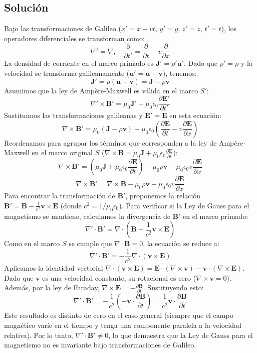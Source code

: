 \documentclass[a4paper,11pt]{article}
\begin{document}
\subsection{Solución}
Bajo las transformaciones de Galileo ($x' = x - vt$, $y' = y$, $z' = z$, $t' = t$), los operadores diferenciales se transforman como:
$$ \nabla' = \nabla, \quad \frac{\partial}{\partial t'} = \frac{\partial}{\partial t} - v \frac{\partial}{\partial x} $$
La densidad de corriente en el marco primado es $\mathbf{J}' = \rho' \mathbf{u}'$. Dado que $\rho' = \rho$ y la velocidad se transforma galileanamente ($\mathbf{u}' = \mathbf{u} - \mathbf{v}$), tenemos:
$$ \mathbf{J}' = \rho (\mathbf{u} - \mathbf{v}) = \mathbf{J} - \rho \mathbf{v} $$
Asumimos que la ley de Ampère-Maxwell es válida en el marco $S'$:
$$ \nabla' \times \mathbf{B}' = \mu_0 \mathbf{J}' + \mu_0 \epsilon_0 \frac{\partial \mathbf{E}'}{\partial t'} $$
Sustituimos las transformaciones galileanas y $\mathbf{E}' = \mathbf{E}$ en esta ecuación:
$$ \nabla \times \mathbf{B}' = \mu_0 (\mathbf{J} - \rho \mathbf{v}) + \mu_0 \epsilon_0 \left( \frac{\partial \mathbf{E}}{\partial t} - v \frac{\partial \mathbf{E}}{\partial x} \right) $$
Reordenamos para agrupar los términos que corresponden a la ley de Ampère-Maxwell en el marco original $S$ ($\nabla \times \mathbf{B} = \mu_0 \mathbf{J} + \mu_0 \epsilon_0 \frac{\partial \mathbf{E}}{\partial t}$):
$$ \nabla \times \mathbf{B}' = \left( \mu_0 \mathbf{J} + \mu_0 \epsilon_0 \frac{\partial \mathbf{E}}{\partial t} \right) - \mu_0 \rho \mathbf{v} - \mu_0 \epsilon_0 v \frac{\partial \mathbf{E}}{\partial x} $$
$$ \nabla \times \mathbf{B}' = \nabla \times \mathbf{B} - \mu_0 \rho \mathbf{v} - \mu_0 \epsilon_0 v \frac{\partial \mathbf{E}}{\partial x} $$
Para encontrar la transformación de $\mathbf{B}'$, proponemos la relación $\mathbf{B}' = \mathbf{B} - \frac{1}{c^2} \mathbf{v} \times \mathbf{E}$ (donde $c^2 = 1/\mu_0\epsilon_0$). Para verificar si la Ley de Gauss para el magnetismo se mantiene, calculamos la divergencia de $\mathbf{B}'$ en el marco primado:
$$ \nabla' \cdot \mathbf{B}' = \nabla \cdot \left( \mathbf{B} - \frac{1}{c^2} \mathbf{v} \times \mathbf{E} \right) $$
Como en el marco $S$ se cumple que $\nabla \cdot \mathbf{B} = 0$, la ecuación se reduce a:
$$ \nabla' \cdot \mathbf{B}' = - \frac{1}{c^2} \nabla \cdot (\mathbf{v} \times \mathbf{E}) $$
Aplicamos la identidad vectorial $\nabla \cdot (\mathbf{v} \times \mathbf{E}) = \mathbf{E} \cdot (\nabla \times \mathbf{v}) - \mathbf{v} \cdot (\nabla \times \mathbf{E})$. Dado que $\mathbf{v}$ es una velocidad constante, su rotacional es cero ($\nabla \times \mathbf{v} = 0$). Además, por la ley de Faraday, $\nabla \times \mathbf{E} = -\frac{\partial \mathbf{B}}{\partial t}$. Sustituyendo esto:
$$ \nabla' \cdot \mathbf{B}' = - \frac{1}{c^2} \left( - \mathbf{v} \cdot \frac{\partial \mathbf{B}}{\partial t} \right) = \frac{1}{c^2} \mathbf{v} \cdot \frac{\partial \mathbf{B}}{\partial t} $$
Este resultado es distinto de cero en el caso general (siempre que el campo magnético varíe en el tiempo y tenga una componente paralela a la velocidad relativa). Por lo tanto, $\nabla' \cdot \mathbf{B}' \neq 0$, lo que demuestra que la Ley de Gauss para el magnetismo no es invariante bajo transformaciones de Galileo.
\end{document}
